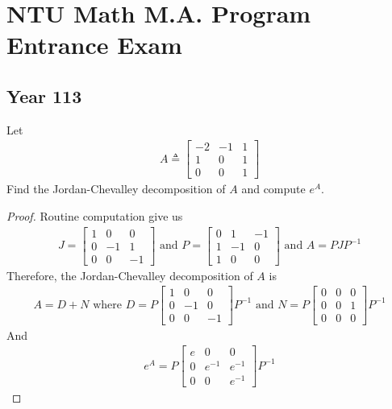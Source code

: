 \documentclass{report}
\begin{document}
\chapter{NTU Math M.A. Program Entrance Exam} 
\section{Year 113}
\begin{question}{}{}
Let 
\begin{align*}
A\triangleq  \begin{bmatrix}
  -2 & -1 & 1\\
  1 & 0 & 1\\
  0 & 0 & 1
\end{bmatrix}
\end{align*}
Find the Jordan-Chevalley decomposition of $A$ and compute  $e^A$. 
\end{question}
\begin{proof}
Routine computation give us 
\begin{align*}
J=\begin{bmatrix}
  1 & 0 & 0 \\
  0 & -1 & 1\\
  0 & 0 & -1
\end{bmatrix}\text{ and }P=\begin{bmatrix}
  0 & 1 & -1 \\
  1 & -1 & 0 \\
  1 & 0 & 0
\end{bmatrix}\text{ and }A=PJP^{-1}
\end{align*}
Therefore, the Jordan-Chevalley decomposition of $A$ is 
\begin{align*}
A= D+ N \text{ where }D=P\begin{bmatrix}
  1 & 0 & 0 \\
  0 & -1 & 0 \\
  0 & 0 & -1 
\end{bmatrix}P^{-1}\text{ and }N=P\begin{bmatrix}
0 & 0 & 0 \\
0 & 0 & 1 \\
0 & 0 & 0
\end{bmatrix}P ^{-1}
\end{align*}
And 
\begin{align*}
e^A= P\begin{bmatrix}
  e & 0 & 0\\
  0 & e^{-1} & e^{-1} \\
  0 & 0 & e^{-1}
\end{bmatrix} P^{-1}
\end{align*}
\end{proof}
\end{document}
